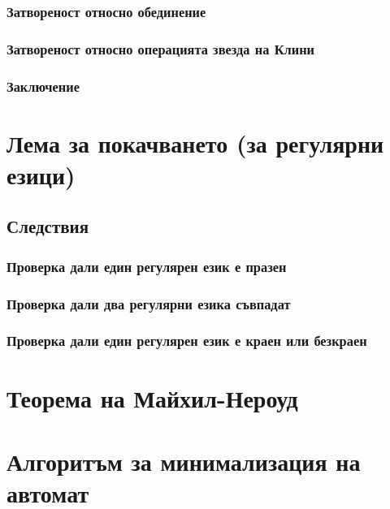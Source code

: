 \documentclass[12pt]{article}
\begin{document}
\subsubsection{Затвореност относно обединение}

\subsubsection{Затвореност относно операцията звезда на Клини}

\subsubsection{Заключение}

\section{Лема за покачването (за регулярни езици)}

\subsection{Следствия}

\subsubsection{Проверка дали един регулярен език е празен}

\subsubsection{Проверка дали два регулярни езика съвпадат}

\subsubsection{Проверка дали един регулярен език е краен или безкраен}

\section{Теорема на Майхил-Нероуд}

\section{Алгоритъм за минимализация на автомат}
\end{document}
